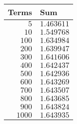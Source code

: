 \begin{tabular}{rl}    \toprule
Terms   & Sum        \\\midrule
$5$     & $1.463611$ \\[4pt]
$10$    & $1.549768$ \\[4pt]
$100$   & $1.634984$ \\[4pt]
$200$   & $1.639947$ \\[4pt]
$300$   & $1.641606$ \\[4pt]
$400$   & $1.642437$ \\[4pt]
$500$   & $1.642936$ \\[4pt]
$600$   & $1.643269$ \\[4pt]
$700$   & $1.643507$ \\[4pt]
$800$   & $1.643685$ \\[4pt]
$900$   & $1.643824$ \\[4pt]
$1000$  & $1.643935$ \\\bottomrule
\end{tabular}

